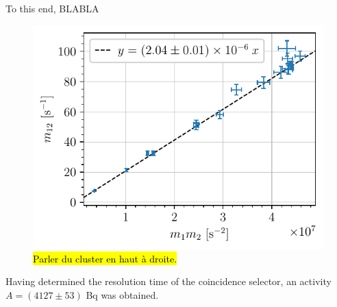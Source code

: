 To this end, BLABLA

\begin{figure}[htbp]
    \centering
    \includegraphics[scale=1]{figures/twotheta_cs137.pdf}
    \caption{\hl{Parler du cluster en haut à droite.}}
    \label{fig:twotheta_cs137}
\end{figure}


Having determined the resolution time of the coincidence selector, an activity $A= (4127 \pm 53)$ Bq was obtained.